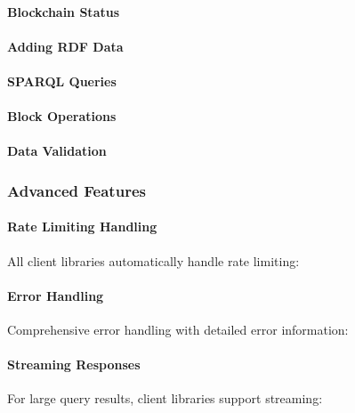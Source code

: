 \documentclass[letterpaper,10pt,english]{sphinxmanual}
\begin{document}
\paragraph{Blockchain Status}
\label{\detokenize{api/client-libraries:blockchain-status}}

\paragraph{Adding RDF Data}
\label{\detokenize{api/client-libraries:adding-rdf-data}}

\paragraph{SPARQL Queries}
\label{\detokenize{api/client-libraries:sparql-queries}}

\paragraph{Block Operations}
\label{\detokenize{api/client-libraries:block-operations}}

\paragraph{Data Validation}
\label{\detokenize{api/client-libraries:data-validation}}

\subsubsection{Advanced Features}
\label{\detokenize{api/client-libraries:advanced-features}}

\paragraph{Rate Limiting Handling}
\label{\detokenize{api/client-libraries:rate-limiting-handling}}
\sphinxAtStartPar
All client libraries automatically handle rate limiting:


\paragraph{Error Handling}
\label{\detokenize{api/client-libraries:error-handling}}
\sphinxAtStartPar
Comprehensive error handling with detailed error information:


\paragraph{Streaming Responses}
\label{\detokenize{api/client-libraries:streaming-responses}}
\sphinxAtStartPar
For large query results, client libraries support streaming:
\end{document}
